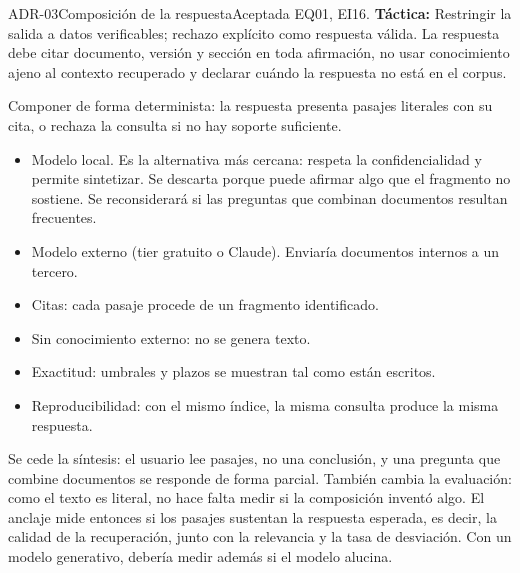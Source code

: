 \begin{adr}{ADR-03}{Composición de la respuesta}{Aceptada}
 EQ01, EI16. \textbf{Táctica:} Restringir la salida a datos verificables; rechazo explícito como respuesta válida.
La respuesta debe citar documento, versión y sección en toda afirmación, no usar conocimiento ajeno al contexto recuperado y declarar cuándo la respuesta no está en el corpus.

Componer de forma determinista: la respuesta presenta pasajes literales con su cita, o rechaza la consulta si no hay soporte suficiente.

\begin{itemize}
  \item Modelo local. Es la alternativa más cercana: respeta la confidencialidad y permite sintetizar. Se descarta porque puede afirmar algo que el fragmento no sostiene.
  Se reconsiderará si las preguntas que combinan documentos resultan frecuentes.
  \item Modelo externo (tier gratuito o Claude). Enviaría documentos internos a un tercero.
\end{itemize}

\begin{itemize}
  \item Citas: cada pasaje procede de un fragmento identificado.
  \item Sin conocimiento externo: no se genera texto.
  \item Exactitud: umbrales y plazos se muestran tal como están escritos.
  \item Reproducibilidad: con el mismo índice, la misma consulta produce la misma respuesta.
\end{itemize}

Se cede la síntesis: el usuario lee pasajes, no una conclusión, y una pregunta que combine documentos se responde de forma parcial. También cambia la evaluación: como el texto es literal, no hace falta medir si la composición inventó algo. El anclaje mide entonces si los pasajes sustentan la respuesta esperada, es decir, la calidad de la recuperación, junto con la relevancia y la tasa de desviación. Con un modelo generativo, debería medir además si el modelo alucina.
\end{adr}


